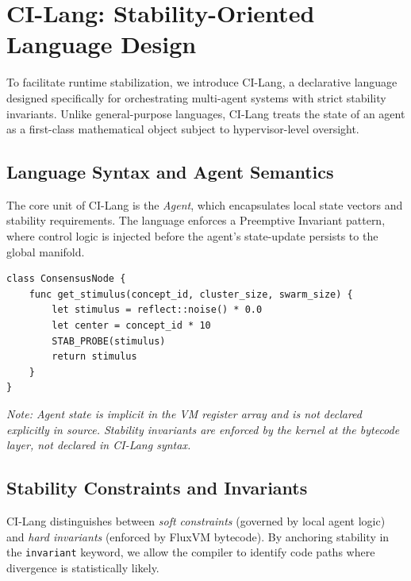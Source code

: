 \documentclass{article}
\begin{document}
\begin{figure}[h]
\end{figure}

\section{CI-Lang: Stability-Oriented Language Design}
\label{sec:cilang_spec}

To facilitate runtime stabilization, we introduce CI-Lang, a declarative language designed specifically for orchestrating multi-agent systems with strict stability invariants. Unlike general-purpose languages, CI-Lang treats the state of an agent as a first-class mathematical object subject to hypervisor-level oversight.

\subsection{Language Syntax and Agent Semantics}
The core unit of CI-Lang is the \textit{Agent}, which encapsulates local state vectors and stability requirements. The language enforces a Preemptive Invariant pattern, where control logic is injected before the agent's state-update persists to the global manifold.

\begin{verbatim}
class ConsensusNode {
    func get_stimulus(concept_id, cluster_size, swarm_size) {
        let stimulus = reflect::noise() * 0.0
        let center = concept_id * 10
        STAB_PROBE(stimulus)
        return stimulus
    }
}
\end{verbatim}
\textit{Note: Agent state is implicit in the VM register array and is not declared
explicitly in source. Stability invariants are enforced by the kernel at the
bytecode layer, not declared in CI-Lang syntax.}

\subsection{Stability Constraints and Invariants}
CI-Lang distinguishes between \textit{soft constraints} (governed by local agent logic) and \textit{hard invariants} (enforced by FluxVM bytecode). By anchoring stability in the \texttt{invariant} keyword, we allow the compiler to identify code paths where divergence is statistically likely.
\end{document}
